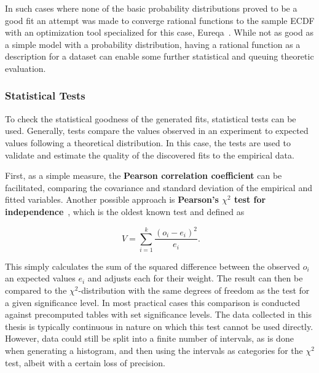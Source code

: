 In such cases where none of the basic probability distributions proved to be a good fit an attempt was made to converge rational functions to the sample \gls{ECDF} with an optimization tool specialized for this case, Eureqa~\cite{eureqa_software, eureqa_paper}. While not as good as a simple model with a probability distribution, having a rational function as a description for a dataset can enable some further statistical and queuing theoretic evaluation.


\subsubsection{Statistical Tests}

To check the statistical goodness of the generated fits, statistical tests can be used. Generally, tests compare the values observed in an experiment to expected values following a theoretical distribution. In this case, the tests are used to validate and estimate the quality of the discovered fits to the empirical data.

First, as a simple measure, the \textbf{Pearson correlation coefficient} can be facilitated, comparing the covariance and standard deviation of the empirical and fitted variables. Another possible approach is \textbf{Pearson's $\chi^2$ test for independence}~\cite{doi:10.1080/14786440009463897}, which is the oldest known test and defined as

\begin{equation}
	\phantom{.}V=\sum_{i=1}^{k} \frac{{(o_i - e_i)}^2}{e_i}\text{.}
\end{equation}

This simply calculates the sum of the squared difference between the observed $o_i$ an expected values $e_i$ and adjusts each for their weight. The result can then be compared to the $\chi^2$-distribution with the same degrees of freedom
as the test for a given significance level. In most practical cases this comparison is conducted against precomputed tables with set significance levels. The data collected in this thesis is typically continuous in nature on which this test cannot be used directly. However, data could still be split into a finite number of intervals, as is done when generating a histogram, and then using the intervals as categories for the $\chi^2$ test, albeit with a certain loss of precision.

